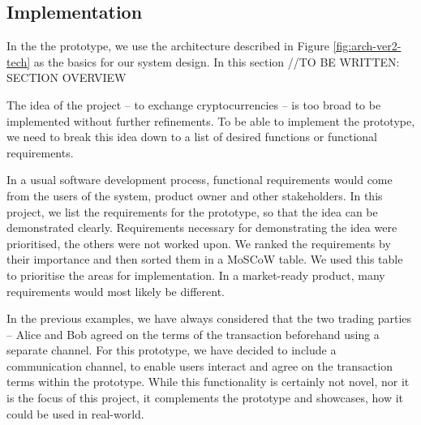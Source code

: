 \subsection{Implementation}
% 
In the the prototype, we use the architecture described in Figure \ref{fig:arch-ver2-tech} as the basics for our system design. In this section //TO BE WRITTEN: SECTION OVERVIEW

The idea of the project -- to exchange cryptocurrencies -- is too broad to be implemented without further refinements. To be able to implement the prototype, we need to break this idea down to a list of desired functions or functional requirements. 

In a usual software development process, functional requirements would come from the users of the system, product owner and other stakeholders. In this project, we list the requirements for the prototype, so that the idea can be demonstrated clearly. Requirements necessary for demonstrating the idea were prioritised, the others were not worked upon. We ranked the requirements by their importance and then sorted them in a MoSCoW table. We used this table to prioritise the areas for implementation. In a market-ready product, many requirements would most likely be different.

In the previous examples, we have always considered that the two trading parties -- Alice and Bob agreed on the terms of the transaction beforehand using a separate channel. For this prototype, we have decided to include a communication channel, to enable users interact and agree on the transaction terms within the prototype. While this functionality is certainly not novel, nor it is the focus of this project, it complements the prototype and showcases, how it could be used in real-world.

